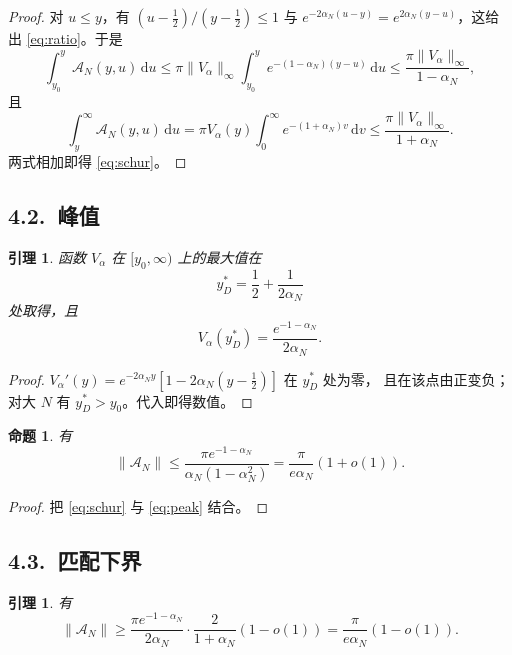 \documentclass[12pt,a4paper]{amsart}
\numberwithin{equation}{section}
\theoremstyle{plain}
\newtheorem{proposition}[theorem]{命题}
\newtheorem{lemma}[theorem]{引理}
\theoremstyle{definition}
\newcommand{\dd}{\,\mathrm{d}}
\begin{document}
\begin{proof}
对 $u\le y$，有 $(u-\frac12)/(y-\frac12)\le1$ 与
$e^{-2\alpha_N(u-y)}=e^{2\alpha_N(y-u)}$，这给出 \eqref{eq:ratio}。于是
\[
 \int_{y_0}^{y}\mathscr A_N(y,u)\dd u
 \le\pi\|V_\alpha\|_\infty\int_{y_0}^{y}e^{-(1-\alpha_N)(y-u)}\dd u
 \le\frac{\pi\|V_\alpha\|_\infty}{1-\alpha_N},
\]
且
\[
 \int_{y}^{\infty}\mathscr A_N(y,u)\dd u
 =\pi V_\alpha(y)\int_0^{\infty}e^{-(1+\alpha_N)v}\dd v
 \le\frac{\pi\|V_\alpha\|_\infty}{1+\alpha_N}.
\]
两式相加即得 \eqref{eq:schur}。
\end{proof}

\subsection*{4.2.\ 峰值}

\begin{lemma}\label{lem:peak}
函数 $V_\alpha$ 在 $[y_0,\infty)$ 上的最大值在
\begin{equation}\label{eq:ystar}
 y_D^*=\frac12+\frac1{2\alpha_N}
\end{equation}
处取得，且
\begin{equation}\label{eq:peak}
 V_\alpha(y_D^*)=\frac{e^{-1-\alpha_N}}{2\alpha_N}.
\end{equation}
\end{lemma}

\begin{proof}
$V_\alpha'(y)=e^{-2\alpha_Ny}[1-2\alpha_N(y-\frac12)]$ 在 $y_D^*$ 处为零，
且在该点由正变负；对大 $N$ 有 $y_D^*>y_0$。代入即得数值。
\end{proof}

\begin{proposition}\label{prop:schur}
有
\begin{equation}\label{eq:upper}
 \|\mathscr A_N\|\le\frac{\pi e^{-1-\alpha_N}}{\alpha_N(1-\alpha_N^2)}
 =\frac{\pi}{e\alpha_N}(1+o(1)).
\end{equation}
\end{proposition}

\begin{proof}
把 \eqref{eq:schur} 与 \eqref{eq:peak} 结合。
\end{proof}

\subsection*{4.3.\ 匹配下界}

\begin{lemma}\label{lem:lower}
有
\begin{equation}\label{eq:lower}
 \|\mathscr A_N\|\ge\frac{\pi e^{-1-\alpha_N}}{2\alpha_N}
 \cdot\frac{2}{1+\alpha_N}(1-o(1))
 =\frac{\pi}{e\alpha_N}(1-o(1)).
\end{equation}
\end{lemma}
\end{document}
